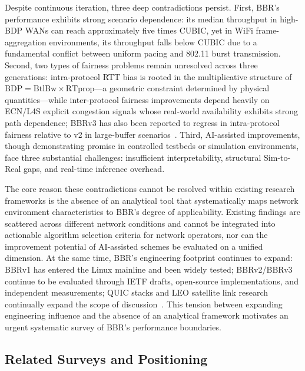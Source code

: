 \documentclass[a4paper,fleqn]{cas-sc}
\begin{document}
Despite continuous iteration, three deep contradictions persist. First, BBR's
performance exhibits strong scenario dependence: its median throughput in
high-BDP WANs can reach approximately five times CUBIC, yet in WiFi
frame-aggregation environments, its throughput falls below CUBIC due to a
fundamental conflict between uniform pacing and 802.11 burst transmission.
Second, two types of fairness problems remain unresolved across three generations:
intra-protocol RTT bias is rooted in the multiplicative structure of
$\mathrm{BDP}=\mathrm{BtlBw}\times\mathrm{RTprop}$---a geometric constraint
determined by physical quantities---while inter-protocol fairness improvements
depend heavily on ECN/L4S explicit congestion signals whose real-world
availability exhibits strong path dependence; BBRv3 has also been reported to
regress in intra-protocol fairness relative to v2 in large-buffer
scenarios~\citep{rfc3168,rfc9330,rfc9331,rfc9332,piotrowska2024}. Third,
AI-assisted improvements, though demonstrating promise in controlled testbeds
or simulation environments, face three substantial challenges: insufficient
interpretability, structural Sim-to-Real gaps, and real-time inference overhead.

The core reason these contradictions cannot be resolved within existing research
frameworks is the absence of an analytical tool that systematically maps network
environment characteristics to BBR's degree of applicability. Existing findings
are scattered across different network conditions and cannot be integrated into
actionable algorithm selection criteria for network operators, nor can the
improvement potential of AI-assisted schemes be evaluated on a unified dimension.
At the same time, BBR's engineering footprint continues to expand: BBRv1 has
entered the Linux mainline and been widely tested; BBRv2/BBRv3 continue to be
evaluated through IETF drafts, open-source implementations, and independent
measurements; QUIC stacks and LEO satellite link research continually expand the
scope of discussion~\citep{cardwell2017bbr,cardwell2019bbrv2,ietf_ccwg_bbr,abrol2026bbr,zeynali2024bbrv3}.
This tension between expanding engineering influence and the absence of an
analytical framework motivates an urgent systematic survey of BBR's performance
boundaries.

\subsection{Related Surveys and Positioning}
\label{sec:related}
\end{document}
